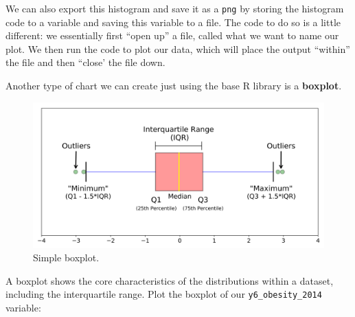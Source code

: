 \documentclass[
]{book}
\newenvironment{Shaded}{\begin{snugshade}}{\end{snugshade}}
\newcommand{\AttributeTok}[1]{\textcolor[rgb]{0.77,0.63,0.00}{#1}}
\newcommand{\CommentTok}[1]{\textcolor[rgb]{0.56,0.35,0.01}{\textit{#1}}}
\newcommand{\DecValTok}[1]{\textcolor[rgb]{0.00,0.00,0.81}{#1}}
\newcommand{\FunctionTok}[1]{\textcolor[rgb]{0.00,0.00,0.00}{#1}}
\newcommand{\NormalTok}[1]{#1}
\newcommand{\SpecialCharTok}[1]{\textcolor[rgb]{0.00,0.00,0.00}{#1}}
\newcommand{\StringTok}[1]{\textcolor[rgb]{0.31,0.60,0.02}{#1}}
\begin{document}
We can also export this histogram and save it as a \texttt{png} by storing the histogram code to a variable and saving this variable to a file. The code to do so is a little different: we essentially first ``open up'' a file, called what we want to name our plot. We then run the code to plot our data, which will place the output ``within'' the file and then ``close' the file down.

\begin{Shaded}
\end{Shaded}

Another type of chart we can create just using the base R library is a \textbf{boxplot}.

\begin{figure}

{\centering \includegraphics[width=650pt]{images/w07/boxplot} 

}

\caption{Simple boxplot.}\label{fig:07-boxplot-img}
\end{figure}

A boxplot shows the core characteristics of the distributions within a dataset, including the interquartile range. Plot the boxplot of our \texttt{y6\_obesity\_2014} variable:
\end{document}
